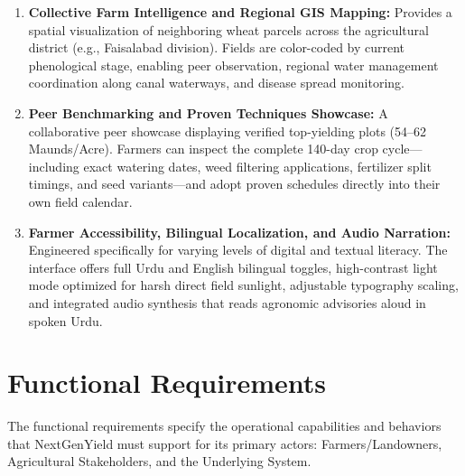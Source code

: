 \documentclass{FastFyp}
\begin{document}
\begin{enumerate}
    \item \textbf{Collective Farm Intelligence and Regional GIS Mapping:} Provides a spatial visualization of neighboring wheat parcels across the agricultural district (e.g., Faisalabad division). Fields are color-coded by current phenological stage, enabling peer observation, regional water management coordination along canal waterways, and disease spread monitoring.
    \item \textbf{Peer Benchmarking and Proven Techniques Showcase:} A collaborative peer showcase displaying verified top-yielding plots (54--62 Maunds/Acre). Farmers can inspect the complete 140-day crop cycle---including exact watering dates, weed filtering applications, fertilizer split timings, and seed variants---and adopt proven schedules directly into their own field calendar.
    \item \textbf{Farmer Accessibility, Bilingual Localization, and Audio Narration:} Engineered specifically for varying levels of digital and textual literacy. The interface offers full Urdu and English bilingual toggles, high-contrast light mode optimized for harsh direct field sunlight, adjustable typography scaling, and integrated audio synthesis that reads agronomic advisories aloud in spoken Urdu.
\end{enumerate}

\section{Functional Requirements}
The functional requirements specify the operational capabilities and behaviors that NextGenYield must support for its primary actors: Farmers/Landowners, Agricultural Stakeholders, and the Underlying System.
\end{document}
